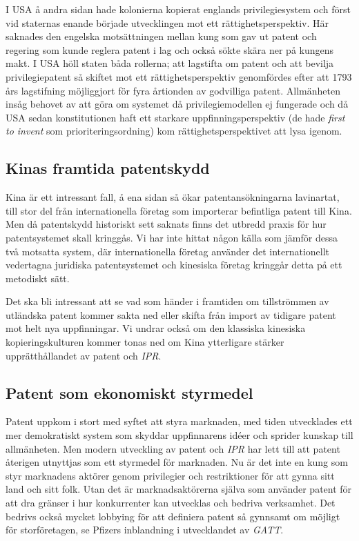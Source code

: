 I USA å andra sidan hade kolonierna kopierat englands privilegiesystem och först vid staternas enande började utvecklingen mot ett rättighetsperspektiv. Här saknades den engelska motsättningen mellan kung som gav ut patent och regering som kunde reglera patent i lag och också sökte skära ner på kungens makt. I USA höll staten båda rollerna; att lagstifta om patent och att bevilja privilegiepatent så skiftet mot ett rättighetsperspektiv genomfördes efter att 1793 års lagstifning möjliggjort för fyra årtionden av godvilliga patent. Allmänheten insåg behovet av att göra om systemet då privilegiemodellen ej fungerade och då USA sedan konstitutionen haft ett starkare uppfinningsperspektiv (de hade \emph{first to invent} som prioriteringsordning) kom rättighetsperspektivet att lysa igenom.


\subsection{Kinas framtida patentskydd}

Kina är ett intressant fall, å ena sidan så ökar patentansökningarna lavinartat, till stor del från internationella företag som importerar befintliga patent till Kina. Men då patentskydd historiskt sett saknats finns det  utbredd praxis för hur patentsystemet skall kringgås. Vi har inte hittat någon källa som jämför dessa två motsatta system, där internationella företag använder det internationellt vedertagna juridiska patentsystemet och kinesiska företag kringgår detta på ett metodiskt sätt. 

Det ska bli intressant att se vad som händer i framtiden om tillströmmen av utländska patent kommer sakta ned eller skifta från import av tidigare patent mot helt nya uppfinningar. Vi undrar också om den klassiska kinesiska kopieringskulturen kommer tonas ned om Kina ytterligare stärker upprätthållandet av patent och \emph{IPR}.

\subsection{Patent som ekonomiskt styrmedel}
Patent uppkom i stort med syftet att styra marknaden, med tiden utvecklades ett mer demokratiskt system som skyddar uppfinnarens idéer och sprider kunskap till allmänheten. Men modern utveckling  av patent och \emph{IPR} har lett till att patent återigen utnyttjas som ett styrmedel för marknaden. Nu är det inte en kung som styr marknadens aktörer genom privilegier och restriktioner för att gynna sitt land och sitt folk. Utan det är marknadsaktörerna själva som använder patent för att dra gränser i hur konkurrenter kan utvecklas och bedriva verksamhet. Det bedrivs också mycket lobbying för att definiera patent så gynnsamt om möjligt för storföretagen, se Pfizers inblandning i utvecklandet av \emph{GATT}.

